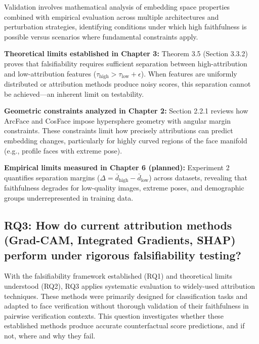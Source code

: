 Validation involves mathematical analysis of embedding space properties combined with empirical evaluation across multiple architectures and perturbation strategies, identifying conditions under which high faithfulness is possible versus scenarios where fundamental constraints apply.

\vspace{0.3cm}
\noindent\textbf{Theoretical limits established in Chapter 3:} Theorem 3.5 (Section 3.3.2) proves that falsifiability requires sufficient separation between high-attribution and low-attribution features ($\tau_{\text{high}} > \tau_{\text{low}} + \epsilon$). When features are uniformly distributed or attribution methods produce noisy scores, this separation cannot be achieved---an inherent limit on testability.

\vspace{0.3cm}
\noindent\textbf{Geometric constraints analyzed in Chapter 2:} Section 2.2.1 reviews how ArcFace and CosFace impose hypersphere geometry with angular margin constraints. These constraints limit how precisely attributions can predict embedding changes, particularly for highly curved regions of the face manifold (e.g., profile faces with extreme pose).

\vspace{0.3cm}
\noindent\textbf{Empirical limits measured in Chapter 6 (planned):} Experiment 2 quantifies separation margins ($\Delta = \bar{d}_{\text{high}} - \bar{d}_{\text{low}}$) across datasets, revealing that faithfulness degrades for low-quality images, extreme poses, and demographic groups underrepresented in training data.

\subsection*{RQ3: How do current attribution methods (Grad-CAM, Integrated Gradients, SHAP) perform under rigorous falsifiability testing?}

With the falsifiability framework established (RQ1) and theoretical limits understood (RQ2), RQ3 applies systematic evaluation to widely-used attribution techniques. These methods were primarily designed for classification tasks and adapted to face verification without thorough validation of their faithfulness in pairwise verification contexts. This question investigates whether these established methods produce accurate counterfactual score predictions, and if not, where and why they fail.

